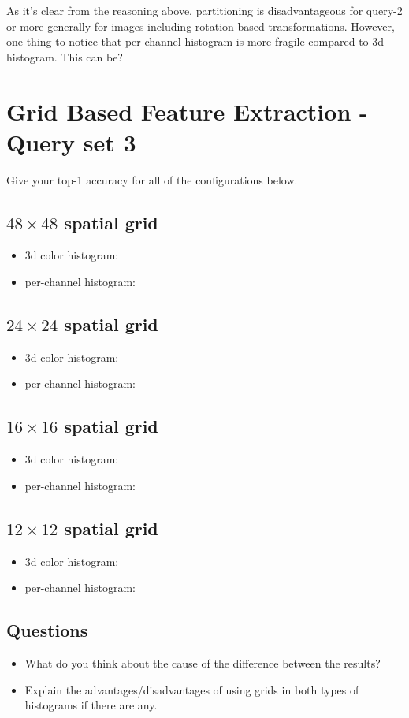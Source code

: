 \documentclass[12pt]{article}
\begin{document}
As it's clear from the reasoning above, partitioning is disadvantageous for query-2 or more generally for
images including rotation based transformations. However, one thing to notice that
per-channel histogram is more fragile compared to 3d histogram. This can be? %

\section{Grid Based Feature Extraction - Query set 3}
Give your top-1 accuracy for all of the configurations below.

\subsection{$48\times48$ spatial grid}
\begin{itemize}
\item 3d color histogram:
\item per-channel histogram:
\end{itemize}

\subsection{$24\times24$ spatial grid}
\begin{itemize}
\item 3d color histogram:
\item per-channel histogram:
\end{itemize}

\subsection{$16\times16$ spatial grid}
\begin{itemize}
\item 3d color histogram:
\item per-channel histogram:
\end{itemize}

\subsection{$12\times12$ spatial grid}
\begin{itemize}
\item 3d color histogram:
\item per-channel histogram:
\end{itemize}

\subsection{Questions}
\begin{itemize}
\item What do you think about the cause of the difference between the results?
\item Explain the advantages/disadvantages of using grids in both types of histograms if there are any.
\end{itemize}
\end{document}
